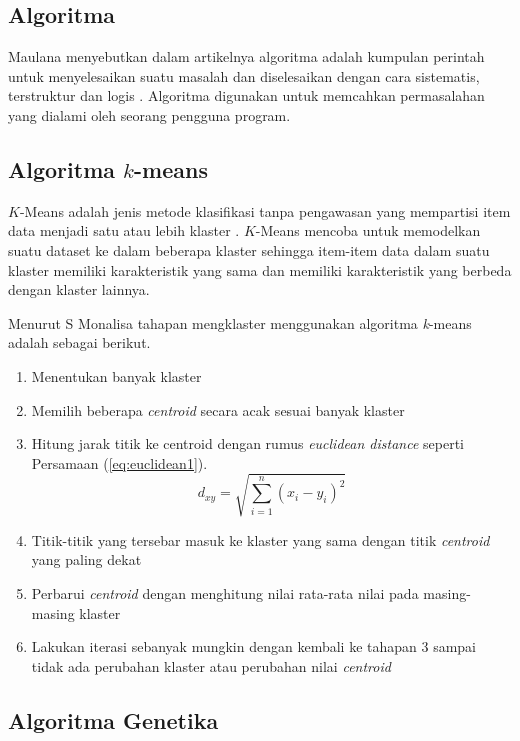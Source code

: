 \subsection{Algoritma}

Maulana menyebutkan dalam artikelnya algoritma adalah kumpulan perintah untuk menyelesaikan suatu masalah dan diselesaikan dengan cara sistematis, terstruktur dan logis \cite{maulana2017pembelajaran}. Algoritma digunakan untuk memcahkan permasalahan yang dialami oleh seorang pengguna program.

\subsection{Algoritma $k$-means}

$K$-Means adalah jenis metode klasifikasi tanpa pengawasan yang mempartisi item data menjadi satu atau lebih klaster \cite{agusta2007k}. $K$-Means mencoba untuk memodelkan suatu dataset ke dalam beberapa klaster sehingga item-item data dalam suatu klaster memiliki karakteristik yang sama dan memiliki karakteristik yang berbeda dengan klaster lainnya.

Menurut S Monalisa \cite{monalisa2018klasterisasi} tahapan mengklaster menggunakan algoritma \textit{k}-means adalah sebagai berikut.

\begin{enumerate}
	\item Menentukan banyak klaster
	\item Memilih beberapa \textit{centroid} secara acak sesuai banyak klaster
	\item Hitung jarak titik ke centroid dengan rumus \textit{euclidean distance} seperti Persamaan (\ref{eq:euclidean1}).
	\begin{equation}
	d_{xy}=\sqrt{\sum_{i=1}^{n}(x_i-y_i)^{2}}
	\label{eq:euclidean1}
	\end{equation}
	\item Titik-titik yang tersebar masuk ke klaster yang sama dengan titik \textit{centroid} yang paling dekat
	\item Perbarui \textit{centroid} dengan menghitung nilai rata-rata nilai pada masing-masing klaster
	\item Lakukan iterasi sebanyak mungkin dengan kembali ke tahapan 3 sampai tidak ada perubahan klaster atau perubahan nilai \textit{centroid}
\end{enumerate}


\subsection{Algoritma Genetika}

